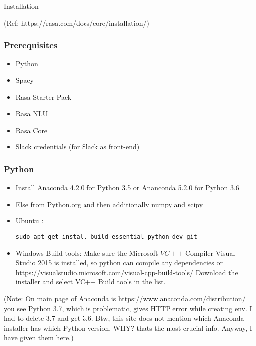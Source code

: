\begin{frame}[fragile]\frametitle{}
\begin{center}
{\Large Installation}

{\tiny (Ref: https://rasa.com/docs/core/installation/)}
\end{center}
\end{frame}

 \begin{frame}[fragile]\frametitle{Prerequisites}
\begin{itemize}
\item Python
\item Spacy
\item Rasa Starter Pack
\item Rasa NLU
\item Rasa Core
\item Slack credentials (for Slack as front-end)
\end{itemize}
\end{frame}


 \begin{frame}[fragile]\frametitle{Python}
\begin{itemize}
\item Install Anaconda 4.2.0 for Python 3.5 or Ananconda 5.2.0 for Python 3.6 
\item Else from Python.org and then additionally numpy and scipy
\item Ubuntu : 
\begin{lstlisting}
sudo apt-get install build-essential python-dev git
\end{lstlisting}
\item Windows Build tools: Make sure the Microsoft $VC++$ Compiler Visual Studio 2015 is installed, so python can compile any dependencies or https://visualstudio.microsoft.com/visual-cpp-build-tools/ Download the installer and select VC++ Build tools in the list.
\end{itemize}

(Note: On main page of Anaconda is https://www.anaconda.com/distribution/ you see Python 3.7, which is problematic, gives HTTP error while creating env. I had to delete 3.7 and get 3.6. Btw, this site does not mention which Anaconda installer has which Python version. WHY? thats the most crucial info. Anyway, I have given them here.)

\end{frame}

